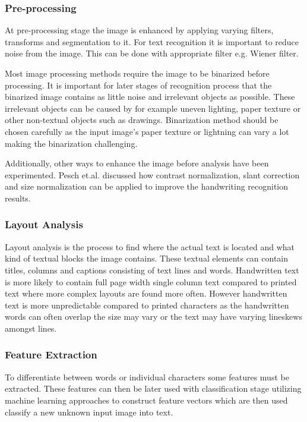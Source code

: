 \documentclass{article}
\begin{document}
      \subsubsection{Pre-processing}
        At pre-processing stage the image is enhanced by applying varying filters, transforms and segmentation to it. For text recognition it is important to reduce noise from the image. This can be done with appropriate filter e.g. Wiener filter.

        Most image processing methods require the image to be binarized before processing. It is important for later stages of recognition process that the binarized image contains as little noise and irrelevant objects as possible.  These irrelevant objects can be caused by for example uneven lighting, paper texture or other non-textual objects such as drawings. Binarization method should be chosen carefully as the input image's paper texture or lightning can vary a lot making the binarization challenging.

        Additionally, other ways to enhance the image before analysis have been experimented. Pesch et.al. discussed how contrast normalization, slant correction and size normalization can be applied to improve the handwriting recognition results. \cite{Pesch2012}

      \subsubsection{Layout Analysis}
        Layout analysis is the process to find where the actual text is located and what kind of textual blocks the image contains. These textual elements can contain titles, columns and captions consisting of text lines and words. Handwritten text is more likely to contain full page width single column text compared to printed text where more complex layouts are found more often. However handwritten text is more unpredictable compared to printed characters as the handwritten words can often overlap the size may vary or the text may have varying lineskews amongst lines.

      \subsubsection{Feature Extraction}
        To differentiate between words or individual characters some features must be extracted. These features can then be later used with classification stage utilizing machine learning approaches to construct feature vectors which are then used classify a new unknown input image into text.
\end{document}

